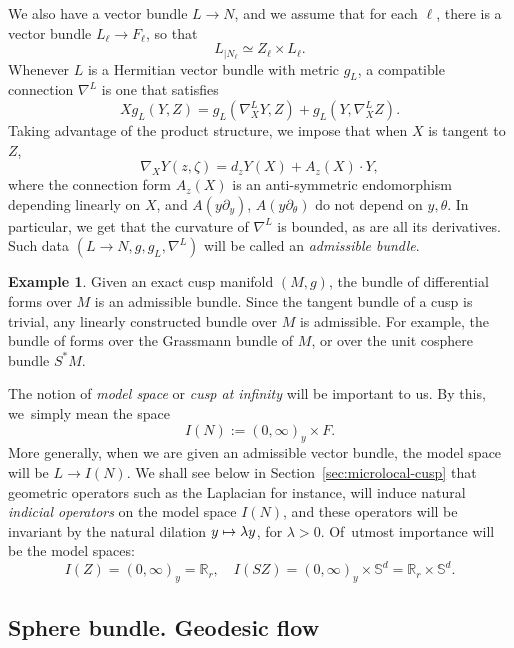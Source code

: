 \documentclass[10pt]{amsart}
\newcommand\mto{\mathchoice{\longmapsto}{\mapsto}{\mapsto}{\mapsto}}
\newcommand{\R}{\mathbb{R}}
\newcommand{\Ss}{\mathbb{S}}
\theoremstyle{plain}
\theoremstyle{definition}
\newtheorem{example}{Example}[section]
\begin{document}
We also have a vector bundle $L\to N$, and we assume that for each $\ell$, there is a vector bundle $L_\ell \to F_\ell$, so that
\[
L_{|N_\ell} \simeq Z_\ell \times L_\ell.
\]
Whenever $L$ is a Hermitian vector bundle with metric $g_L$, a compatible connection $\nabla^L$ is one that satisfies
\[
X g_L(Y,Z) = g_L(\nabla^L_X Y, Z) + g_L(Y, \nabla^L_X Z).
\]
Taking advantage of the product structure, we impose that when $X$ is tangent to $Z$,
\begin{equation}\label{eq:structure-connection}
\nabla_X Y(z,\zeta) = d_z Y(X)+ A_z(X)\cdot Y,
\end{equation}
where the connection form $A_z(X)$ is an anti-symmetric endomorphism depending linearly on $X$, and $A(y\partial_y)$, $A(y\partial_\theta)$ do not depend on $y,\theta$. In particular, we get that the curvature of $\nabla^L$ is bounded, as are all its derivatives. Such data $(L\to N, g, g_L,\nabla^L)$ will be called an \emph{admissible bundle}.

\begin{example}Given an exact cusp manifold $(M,g)$, the bundle of differential forms over $M$ is an admissible bundle. Since the tangent bundle of a cusp is trivial, any linearly constructed bundle over $M$ is admissible. For example, the bundle of forms over the Grassmann bundle of $M$, or over the unit cosphere bundle $S^\ast M$.
\end{example}

The notion of \emph{model space} or \emph{cusp at infinity} will be important to us. By this, we~simply mean the space
\[
I(N) := (0,\infty)_y \times F.
\]
More generally, when we are given an admissible vector bundle, the model space will be $L \to I(N)$. We shall see below in Section~\ref{sec:microlocal-cusp} that geometric operators such as the Laplacian for instance, will induce natural \emph{indicial operators} on the model space $I(N)$, and these operators will be invariant by the natural dilation $y \mto \lambda y$, for $\lambda > 0$. Of~utmost importance will be the model spaces:
\[
I(Z) = (0,\infty)_y = \R_r ,\quad I(SZ) = (0,\infty)_y \times \Ss^d = \R_r \times \Ss^d.
\]

\subsection{Sphere bundle. Geodesic flow}

\label{ssection:preliminaires-geo}
\end{document}
